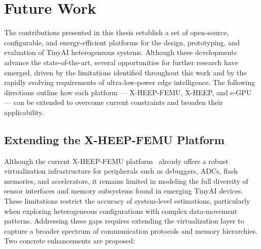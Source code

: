     \section{Future Work}
    
        The contributions presented in this thesis establish a set of open-source, configurable, and energy-efficient platforms for the design, prototyping, and evaluation of TinyAI heterogeneous systems. Although these developments advance the state-of-the-art, several opportunities for further research have emerged, driven by the limitations identified throughout this work and by the rapidly evolving requirements of ultra-low-power edge intelligence. The following directions outline how each platform --- \mbox{X-HEEP-FEMU}, \mbox{X-HEEP}, and \mbox{e-GPU} --- can be extended to overcome current constraints and broaden their applicability.
        
        \subsection{Extending the X-HEEP-FEMU Platform}
        
            Although the current \mbox{X-HEEP-FEMU} platform~\cite{femu} already offers a robust virtualization infrastructure for peripherals such as debuggers, ADCs, flash memories, and accelerators, it remains limited in modeling the full diversity of sensor interfaces and memory subsystems found in emerging TinyAI devices. These limitations restrict the accuracy of system-level estimations, particularly when exploring heterogeneous configurations with complex data-movement patterns. Addressing these gaps requires extending the virtualization layer to capture a broader spectrum of communication protocols and memory hierarchies. Two concrete enhancements are proposed:
            
